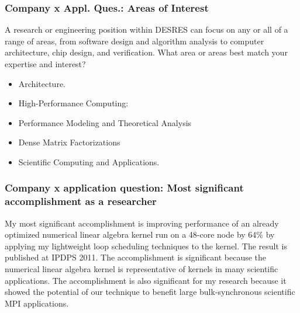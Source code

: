 \begin{frame}
\frametitle{Company x Appl. Ques.: Areas of Interest} 
{\tiny A research or engineering position within DESRES can focus on
  any or all of a range of areas, from software design and algorithm
  analysis to computer architecture, chip design, and
  verification. What area or areas best match your expertise and
  interest?} 
\begin{itemize} 
\tiny \item \tiny Architecture. 
\item \tiny High-Performance Computing: 
\item \tiny Performance Modeling and Theoretical Analysis
\item \tiny Dense Matrix Factorizations 
\item \tiny Scientific Computing and Applications. 
\end{itemize}
\end{frame}


\begin{frame} 
\frametitle{Company x application question: Most significant
  accomplishment as a researcher}

My most significant accomplishment is improving performance of an
already optimized numerical linear algebra kernel run on a 48-core
node by 64\% by applying my lightweight loop scheduling techniques to
the kernel. The result is published at IPDPS 2011. The accomplishment
is significant because the numerical linear algebra kernel is
representative of kernels in many scientific applications. The
accomplishment is also significant for my research because it showed
the potential of our technique to benefit large bulk-synchronous
scientific MPI applications.

\end{frame} 


